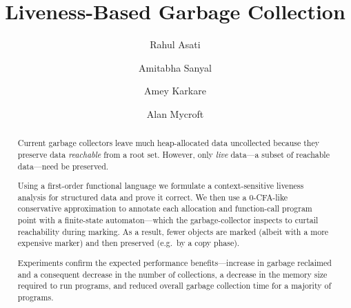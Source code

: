 \documentclass{llncs}
\begin{document}
\title{Liveness-Based Garbage Collection}

\setcounter{tocdepth}{2}
\makeatletter
\renewcommand*\l@author[2]{}
\renewcommand*\l@title[2]{}
\makeatletter



  \author{Rahul Asati \and Amitabha Sanyal \and Amey Karkare
    \and   Alan Mycroft}
\maketitle

\begin{abstract}
Current garbage collectors  leave much heap-allocated data uncollected
because they preserve data {\em reachable} from a root set.
However, only  {\em live} data---a subset of  reachable data---need be
preserved.

Using   a    first-order   functional   language    we   formulate   a
context-sensitive liveness  analysis for structured data  and prove it
correct.   We  then use  a  0-CFA-like  conservative approximation  to
annotate  each  allocation  and  function-call program  point  with  a
finite-state  automaton---which   the  garbage-collector  inspects  to
curtail reachability  during marking. As  a result, fewer  objects are
marked  (albeit  with a  more  expensive  marker)  and then  preserved
(e.g.\ by a copy phase).

Experiments  confirm the  expected performance  benefits---increase in
garbage  reclaimed  and  a   consequent  decrease  in  the  number  of
collections, a decrease  in the memory size required  to run programs,
and  reduced  overall  garbage  collection  time  for  a  majority  of
programs.
\end{abstract}

\end{document}
